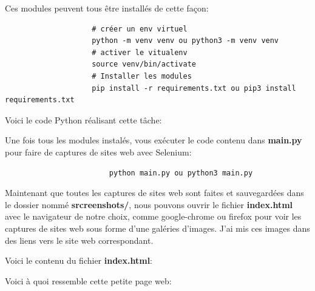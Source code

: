 \documentclass[a4paper,11pt]{article}
\begin{document}
            \noindent Ces modules peuvent tous être installés de cette façon:
            \begin{tcolorbox}[colback=lightgray!6, colframe=black, left=-40mm, right=5mm, top=2mm, bottom=-2mm, boxrule=0.1mm]
                \begin{verbatim}
                    # créer un env virtuel
                    python -m venv venv ou python3 -m venv venv 
                    # activer le vitualenv
                    source venv/bin/activate 
                    # Installer les modules
                    pip install -r requirements.txt ou pip3 install requirements.txt
                \end{verbatim}
            \end{tcolorbox}

            \noindent 

            \noindent Voici le code Python réalisant cette tâche: 
                
            
            \noindent Une fois tous les modules instalés, vous exécuter le code contenu dans \textbf{main.py} pour faire de captures de sites web avec Selenium:
                \begin{tcolorbox}[colback=lightgray!6, colframe=black, left=-40mm, right=5mm, top=2mm, bottom=-2mm, boxrule=0.1mm]
                    \begin{verbatim}
                        python main.py ou python3 main.py
                    \end{verbatim}
                \end{tcolorbox}
            
            \noindent Maintenant que toutes les captures de sites web sont faites et sauvegardées dans le dossier nommé
            \textbf{srcreenshots/}, nous pouvons ouvrir le fichier \textbf{index.html} avec le navigateur de notre choix, comme google-chrome ou 
            firefox pour voir les captures de sites web sous forme d'une galéries d'images. 
            J'ai mis ces images dans des liens vers le site web correspondant. 
            
            \newpage 
            \noindent Voici le contenu du fichier \textbf{index.html}: 
            
            
            \newpage
            \noindent Voici à quoi ressemble cette petite page web:
\end{document}
